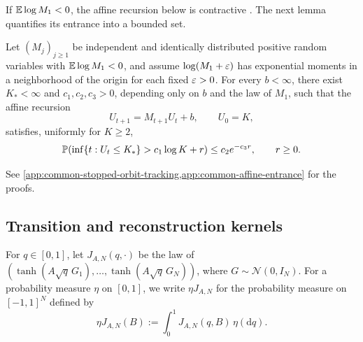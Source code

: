 \documentclass[11pt,reqno,a4paper]{article}
\newcommand{\Pp}{\P}
\newcommand{\Ee}{\E}
\begin{document}
If $\Ee\log M_1<0$, the affine recursion below is contractive
\cite{buraczewski-damek-mikosch2016}. The next lemma quantifies its entrance
into a bounded set.
\begin{lemma}
\label{lem:negative-drift-affine-entrance}
  Let $(M_j)_{j\geq1}$ be independent and identically distributed positive
  random variables with $\Ee\log M_1<0$, and assume $\log(M_1+\varepsilon)$ has
  exponential moments in a neighborhood of the origin for each fixed
  $\varepsilon>0$. For every $b<\infty$, there exist $K_\ast<\infty$ and
  $c_1,c_2,c_3>0$, depending only on $b$ and the law of $M_1$, such that the
  affine recursion
  \begin{equation*}
    U_{t+1}=M_{t+1}U_t+b,
    \qquad
    U_0=K,
  \end{equation*}
  satisfies, uniformly for $K\geq2$,
  \begin{equation}\label{eq:negative-drift-affine-entrance}
    \Pp\left(\inf\{t:U_t\leq K_\ast\}>c_1\log K+r\right)
    \leq
    c_2 e^{-c_3r},
    \qquad r\geq0.
  \end{equation}
\end{lemma}

See \cref{app:common-stopped-orbit-tracking,app:common-affine-entrance} for the
proofs.

\subsection{Transition and reconstruction kernels}
\label{subsec:vector-radius-kernels}

For $q\in[0,1]$, let $J_{A,N}(q,\cdot)$ be the law of
$(\tanh(A\sqrt q\,G_1),\ldots,\tanh(A\sqrt q\,G_N))$, where
$G\sim\mathcal N(0,I_N)$.
For a probability measure $\eta$ on $[0,1]$, we write
$\eta J_{A,N}$ for the probability measure on $[-1,1]^N$ defined by
\begin{equation*}
  \eta J_{A,N}(B)
  :=
  \int_0^1 J_{A,N}(q,B)\,\eta(\mathrm{d}q).
\end{equation*}
\end{document}
